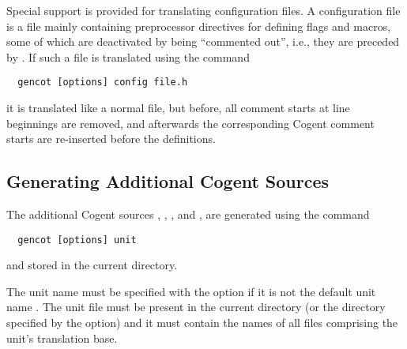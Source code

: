 Special support is provided for translating configuration files. A configuration file is a  file mainly
containing preprocessor directives for defining flags and macros, some of which are deactivated by being ``commented
out'', i.e., they are preceded by \code{//}. If such a file is translated using the command
\begin{verbatim}
  gencot [options] config file.h
\end{verbatim}
it is translated like a normal  file, but before, all \code{//} comment starts at line beginnings are 
removed, and afterwards the corresponding Cogent comment starts \code{-\relax-} are re-inserted before the definitions.

\subsection{Generating Additional Cogent Sources}
\label{app-transauto-unit}

The additional Cogent sources , , , 
and , are generated using the command
\begin{verbatim}
  gencot [options] unit
\end{verbatim}
and stored in the current directory.

The unit name  must be specified with the  option if it is not the default unit name . The 
unit file  must be present in the current directory (or the directory specified by the  option)
and it must contain the names of all  files comprising the unit's translation base.

